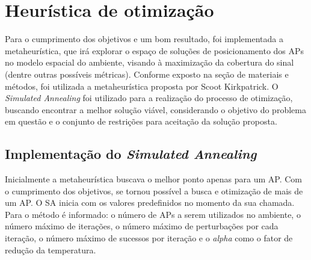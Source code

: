 \documentclass[
	12pt,				%
	openright,			%
	twoside,			%
	a4paper,			%
	english,			%
	french,				%
	spanish,			%
	brazil				%
	]{abntex2}
\begin{document}
\clearpage

\section[Heurística de otimização]{Heurística de otimização}

Para o cumprimento dos objetivos e um bom resultado, foi implementada a metaheurística, que irá explorar o espaço de soluções de posicionamento dos APs no modelo espacial do ambiente, visando à maximização da cobertura do sinal (dentre outras possíveis métricas). Conforme exposto na seção de materiais e métodos, foi utilizada a metaheurística proposta por Scoot Kirkpatrick. O \textit{Simulated Annealing} foi utilizado para a realização do processo de otimização, buscando encontrar a melhor solução viável, considerando o objetivo do problema em questão e o conjunto de restrições para aceitação da solução proposta.

\subsection[Implementação do Simulated Annealing]{Implementação do \textit{Simulated Annealing}}

Inicialmente a metaheurística buscava o melhor ponto apenas para um AP. Com o cumprimento dos objetivos,  se tornou possível a busca e otimização de mais de um AP. O SA inicia com os valores predefinidos no momento da sua chamada. Para o método é informado: o número de APs a serem utilizados no ambiente, o número máximo de iterações, o número máximo de perturbações por cada iteração, o número máximo de sucessos por iteração e o \textit{alpha} como o fator de redução da temperatura.
\end{document}
